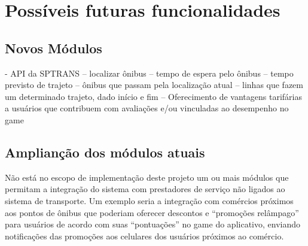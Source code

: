 \section{Possíveis futuras funcionalidades}\label{sec:futuro}
\subsection{Novos Módulos}\label{subsec:futuro-novos-mod}
 - API da SPTRANS
  -- localizar ônibus
  -- tempo de espera pelo ônibus
  -- tempo previsto de trajeto
  -- ônibus que passam pela localização atual
  -- linhas que fazem um determinado trajeto, dado início e fim
  -- Oferecimento de vantagens tarifárias a usuários que contribuem com avaliações e/ou vinculadas ao desempenho no game

\subsection{Amplianção dos módulos atuais}\label{subsec:futuro-expansao-mod}

Não está no escopo de implementação deste projeto um ou mais módulos que permitam a integração do sistema com prestadores de serviço não ligados ao sistema de transporte. Um exemplo seria a integração com comércios próximos aos pontos de ônibus que poderiam oferecer descontos e ``promoções relâmpago'' para usuários de acordo com suas ``pontuações'' no game do aplicativo, enviando notificações das promoções aos celulares dos usuários próximos ao comércio.